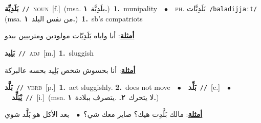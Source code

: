 \documentclass[10pt,a4paper,twoside]{article} %
\begin{document}
\begin{multicols}{2}
{\setlength\topsep{0pt}\textbf{\foreignlanguage{arabic}{بَلَدِيِّة}}\ {\color{gray}\texttt{//}\color{black}}\ \textsc{noun}\ [f.]\ \color{gray}(msa. \foreignlanguage{arabic}{بلَدِيَّة}~\foreignlanguage{arabic}{\textbf{١.}})\color{black}\ \textbf{1.}~munipality\ \ $\bullet$\ \ \textsc{ph.} \color{gray} \foreignlanguage{arabic}{بَلَدِيَّات}\color{black}\ {\color{gray}\texttt{/{\sffamily baladijjaːt}/}\color{black}}\ \color{gray} (msa. \foreignlanguage{arabic}{من نفس البلد}~\foreignlanguage{arabic}{\textbf{١.}})\color{black}\ \textbf{1.}~sb's compatriots\  \begin{flushright}\color{gray}\foreignlanguage{arabic}{\textbf{\underline{\foreignlanguage{arabic}{أمثلة}}}: أنا واياه بَلَدِيّات مولودين ومتربيين ببدو}\end{flushright}\color{black}} \vspace{2mm}

{\setlength\topsep{0pt}\textbf{\foreignlanguage{arabic}{بَلِيد}}\ {\color{gray}\texttt{//}\color{black}}\ \textsc{adj}\ [m.]\ \textbf{1.}~sluggish\  \begin{flushright}\color{gray}\foreignlanguage{arabic}{\textbf{\underline{\foreignlanguage{arabic}{أمثلة}}}: أنا بحسوش شخص بَلِيد بحسه عالبركة}\end{flushright}\color{black}} \vspace{2mm}

{\setlength\topsep{0pt}\textbf{\foreignlanguage{arabic}{بَلَّد}}\ {\color{gray}\texttt{//}\color{black}}\ \textsc{verb}\ [p.]\ \textbf{1.}~act sluggishly.  \textbf{2.}~does not move\ \ $\bullet$\ \ \setlength\topsep{0pt}\textbf{\foreignlanguage{arabic}{بَلِّد}}\ {\color{gray}\texttt{//}\color{black}}\ [c.]\ \ $\bullet$\ \ \setlength\topsep{0pt}\textbf{\foreignlanguage{arabic}{يْبَلِّد}}\ {\color{gray}\texttt{//}\color{black}}\ [i.]\ \color{gray}(msa. \foreignlanguage{arabic}{لا يتحرك}~\foreignlanguage{arabic}{\textbf{٢.}}  .\foreignlanguage{arabic}{يتصرف ببلادة}~\foreignlanguage{arabic}{\textbf{١.}})\color{black}\  \begin{flushright}\color{gray}\foreignlanguage{arabic}{\textbf{\underline{\foreignlanguage{arabic}{أمثلة}}}: مالك بَلَّدِت هيك؟ صاير معك شي؟\ $\bullet$\ \  بعد الأكل هو بَلَّد شوي}\end{flushright}\color{black}} \vspace{2mm}


\end{multicols}
\end{document}
